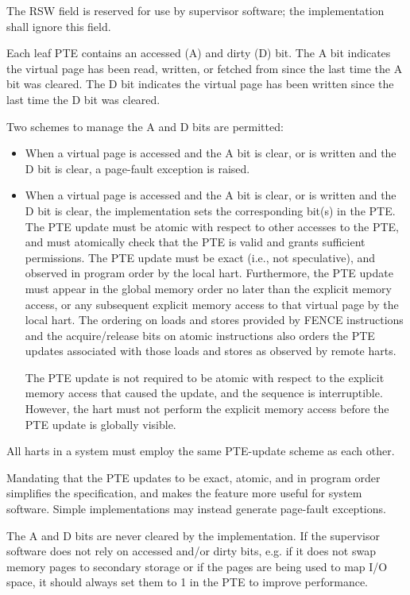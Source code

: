 The RSW field is reserved for use by supervisor software; the implementation
shall ignore this field.

Each leaf PTE contains an accessed (A) and dirty (D) bit.  The A bit indicates
the virtual page has been read, written, or fetched from since the last time
the A bit was cleared.  The D bit indicates the virtual page has been written
since the last time the D bit was cleared.

Two schemes to manage the A and D bits are permitted:
\begin{itemize}
\item When a virtual page is accessed and the A bit is clear, or is
      written and the D bit is clear, a page-fault exception is raised.

\item When a virtual page is accessed and the A bit is clear, or is
      written and the D bit is clear, the implementation sets the
      corresponding bit(s) in the PTE.  The PTE update must be atomic with
      respect to other accesses to the PTE, and must atomically check
      that the PTE is valid and grants sufficient permissions.  The
      PTE update must be exact (i.e., not speculative), and observed
      in program order by the local hart.  Furthermore, the PTE update
      must appear in the global memory order no later than the explicit
      memory access, or any subsequent explicit memory access to that
      virtual page by the local hart.  The ordering on loads and stores
      provided by FENCE instructions and the acquire/release bits on atomic
      instructions also orders the PTE updates associated with those loads
      and stores as observed by remote harts.

      The PTE update is not required to be atomic with respect to the explicit
      memory access that caused the update, and the sequence is interruptible.
      However, the hart must not perform the explicit memory access before the
      PTE update is globally visible.
\end{itemize}
All harts in a system must employ the same PTE-update scheme as each other.

\begin{commentary}
Mandating that the PTE updates to be exact, atomic, and in program order
simplifies the specification, and makes the feature more useful for system
software.  Simple implementations may instead generate page-fault exceptions.
  
The A and D bits are never cleared by the implementation.  If the
supervisor software does not rely on accessed and/or dirty bits,
e.g. if it does not swap memory pages to secondary storage or if the
pages are being used to map I/O space, it should always set them to 1
in the PTE to improve performance.
\end{commentary}

